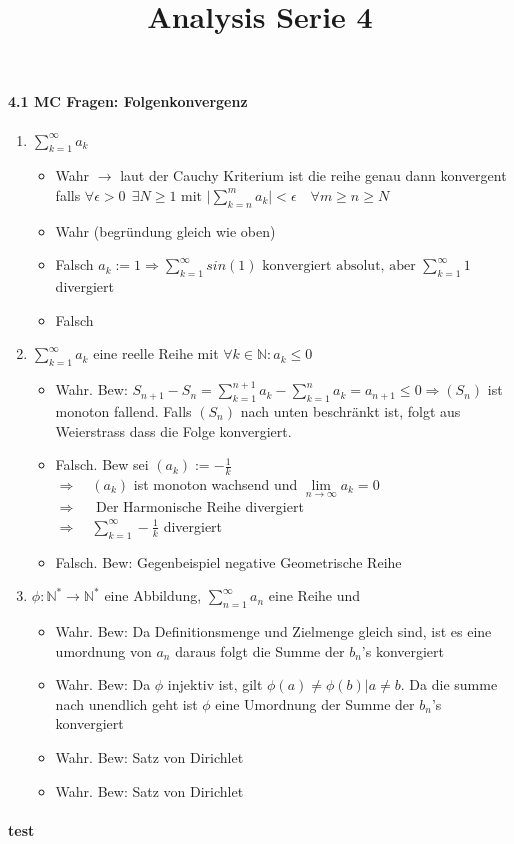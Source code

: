 \documentclass{report}
\title{Analysis Serie 4}
\begin{document}
\paragraph{4.1 MC Fragen: Folgenkonvergenz}
\begin{enumerate}[label = \alph*)]
\item $\displaystyle\sum_{k=1}^{\infty} a_k$
\begin{itemize}
\item Wahr  $\rightarrow$ laut der Cauchy Kriterium ist die reihe genau dann konvergent falls $\forall \epsilon > 0 \ \ \exists N \geq 1 \text{ mit } \bigg|\displaystyle\sum_{k=n}^{m} a_k \bigg| < \epsilon \quad \forall m \geq n \geq N$
\item Wahr (begründung gleich wie oben)
\item Falsch $a_k := 1 \Rightarrow \displaystyle\sum_{k=1}^{\infty} sin(1) \text{ konvergiert absolut, aber } \displaystyle\sum_{k=1}^{\infty} 1$  divergiert
\item Falsch
\end{itemize}
\item $\displaystyle\sum_{k=1}^{\infty} a_k$ eine reelle Reihe mit $\forall k \in \mathbb{N} : a_k \leq 0$
\begin{itemize}
\item Wahr. Bew: $S_{n+1} - S_{n} = \displaystyle\sum_{k=1}^{n+1}a_k - \displaystyle\sum_{k=1}^{n}a_k = a_{n+1} \leq 0 \Rightarrow (S_{n})$ ist monoton fallend. Falls $(S_{n})$ nach unten beschränkt ist, folgt aus Weierstrass dass die Folge konvergiert.
\item Falsch. Bew sei $(a_k) := -\frac{1}{k}$\\
$\Rightarrow \quad (a_k)$ ist monoton wachsend und $\lim\limits_{n \to \infty} a_k = 0$\\
$\Rightarrow \quad$ Der Harmonische Reihe divergiert\\
$\Rightarrow \quad  \displaystyle\sum_{k=1}^{\infty}-\frac{1}{k}$ divergiert
\item Falsch. Bew: Gegenbeispiel negative Geometrische Reihe
\end{itemize}
\item $\phi: \mathbb{N^*} \rightarrow \mathbb{N^*}$ eine Abbildung, $\displaystyle\sum_{n=1}^{\infty}a_n$ eine Reihe und 
\begin{itemize}
\item Wahr. Bew: Da Definitionsmenge und Zielmenge gleich sind, ist es eine umordnung von $a_n$ daraus folgt die Summe der $b_n$'s konvergiert 
\item Wahr. Bew: Da $\phi$ injektiv ist, gilt $\phi(a) \neq \phi(b) | a\neq b$. Da die summe nach unendlich geht ist $\phi$ eine Umordnung der Summe der $b_n$'s konvergiert
\item Wahr. Bew: Satz von Dirichlet
\item Wahr. Bew: Satz von Dirichlet
\end{itemize}
\end{enumerate}
\paragraph{test}
\end{document}
